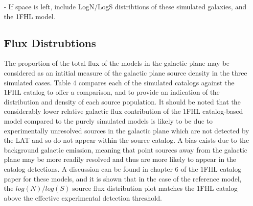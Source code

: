 \documentclass{PoS}
\begin{document}
\begin{table}
\centering
{}
\caption{Parameters for 10 - 500 GeV Galaxy Population Simulations.}
\end{table}

- If space is left, include LogN/LogS distribtions of these simulated galaxies, and the 1FHL model.

\subsection{Flux Distrubtions}

The proportion of the total flux of the models in the galactic plane may be considered as an intitial measure of the galactic plane source density in the three simulated cases. Table 4 compares each of the simulated catalogs against the 1FHL catalog to offer a comparison, and to provide an indication of the distribution and density of each source population. It should be noted that the considerably lower relative galactic flux contribution of the 1FHL catalog-based model compared to the purely simulated models is likely to be due to experimentally unresolved sources in the galactic plane which are not detected by the LAT and so do not appear within the source catalog. A bias exists due to the background galactic emission, meaning that point sources away from the galactic plane may be more readily resolved and thus are more likely to appear in the catalog detections. A discussion can be found in chapter 6 of the 1FHL catalog paper \cite[p.59]{1fhl} for these models, and it is shown that in the case of the reference model, the $log(N)/log(S)$ source flux distribution plot matches the 1FHL catalog above the effective experimental detection threshold.
\end{document}
